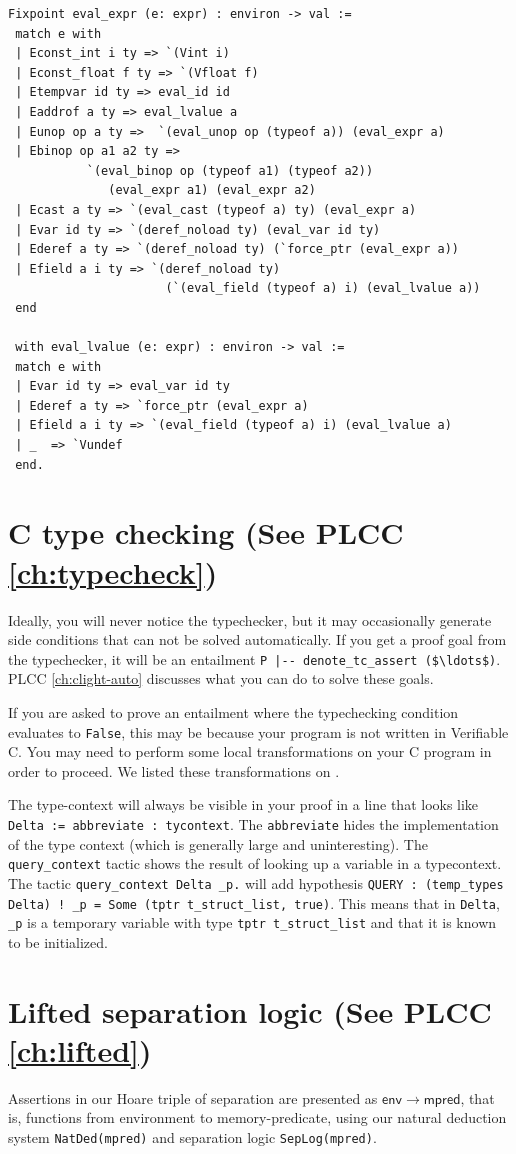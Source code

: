 \documentclass[12pt,fleqn,openany,oneside,showtrims]{memoir}
\newcommand{\ychapter}[2]{\chapter[#1]{#1 \hfill \normalsize #2}}
\begin{document}
\clearpage
\begin{lstlisting}
Fixpoint eval_expr (e: expr) : environ -> val :=
 match e with
 | Econst_int i ty => `(Vint i)
 | Econst_float f ty => `(Vfloat f)
 | Etempvar id ty => eval_id id
 | Eaddrof a ty => eval_lvalue a
 | Eunop op a ty =>  `(eval_unop op (typeof a)) (eval_expr a)
 | Ebinop op a1 a2 ty =>
           `(eval_binop op (typeof a1) (typeof a2))
              (eval_expr a1) (eval_expr a2)
 | Ecast a ty => `(eval_cast (typeof a) ty) (eval_expr a)
 | Evar id ty => `(deref_noload ty) (eval_var id ty)
 | Ederef a ty => `(deref_noload ty) (`force_ptr (eval_expr a))
 | Efield a i ty => `(deref_noload ty)
                      (`(eval_field (typeof a) i) (eval_lvalue a))
 end

 with eval_lvalue (e: expr) : environ -> val :=
 match e with
 | Evar id ty => eval_var id ty
 | Ederef a ty => `force_ptr (eval_expr a)
 | Efield a i ty => `(eval_field (typeof a) i) (eval_lvalue a)
 | _  => `Vundef
 end.
\end{lstlisting}

\ychapter{C type checking}{(See PLCC \autoref{ch:typecheck})}
Ideally, you will never notice the typechecker, but it may occasionally
generate side conditions that can not be solved automatically.
If you get a proof goal from the typechecker, it will be an entailment
\lstinline!P |-- denote_tc_assert ($\ldots$)!. PLCC
\autoref{ch:clight-auto} discusses what you can do to solve these goals.

If you are asked to prove an entailment where the typechecking condition
evaluates to \lstinline|False|, this may be because your program is not written in
Verifiable C. You may need to perform some local transformations on your C
program in order to proceed. We listed these transformations on
.

The type-context will always be visible in your proof in a line that looks like
\lstinline|Delta := abbreviate : tycontext|. The \lstinline|abbreviate|
hides the implementation of the type context (which is generally large
and uninteresting). The
\lstinline|query_context| tactic shows the result of looking up a variable in
a typecontext. The tactic \lstinline|query_context Delta _p.| will add hypothesis
\lstinline|QUERY : (temp_types Delta) ! _p = Some (tptr t_struct_list, true)|.
This means that in \lstinline|Delta|, \lstinline|_p| is a temporary variable
with type \lstinline|tptr t_struct_list| and that it is known to be initialized.

\ychapter{Lifted separation logic}{(See PLCC \autoref{ch:lifted})}
Assertions in our Hoare triple of separation
are presented as $\mathsf{env}\rightarrow
\mathsf{mpred}$, that is, functions from environment
to memory-predicate,
using our natural deduction system
\lstinline{NatDed(mpred)} and separation logic
\lstinline{SepLog(mpred)}.
\end{document}
